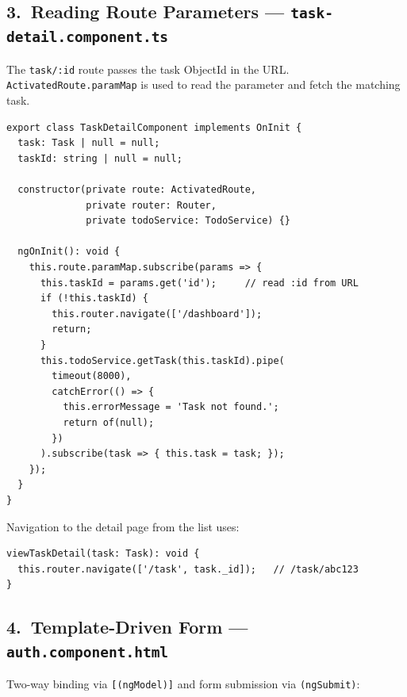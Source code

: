 \documentclass[11pt,a4paper]{article}
\begin{document}
\subsection*{3.\ Reading Route Parameters — \texttt{task-detail.component.ts}}

The \texttt{task/:id} route passes the task ObjectId in the URL.
\texttt{ActivatedRoute.paramMap} is used to read the parameter and fetch the matching task.

\begin{lstlisting}[style=ts, language={[Sharp]C}]
export class TaskDetailComponent implements OnInit {
  task: Task | null = null;
  taskId: string | null = null;

  constructor(private route: ActivatedRoute,
              private router: Router,
              private todoService: TodoService) {}

  ngOnInit(): void {
    this.route.paramMap.subscribe(params => {
      this.taskId = params.get('id');     // read :id from URL
      if (!this.taskId) {
        this.router.navigate(['/dashboard']);
        return;
      }
      this.todoService.getTask(this.taskId).pipe(
        timeout(8000),
        catchError(() => {
          this.errorMessage = 'Task not found.';
          return of(null);
        })
      ).subscribe(task => { this.task = task; });
    });
  }
}
\end{lstlisting}

Navigation to the detail page from the list uses:
\begin{lstlisting}[style=ts, language={[Sharp]C}]
viewTaskDetail(task: Task): void {
  this.router.navigate(['/task', task._id]);   // /task/abc123
}
\end{lstlisting}

\subsection*{4.\ Template-Driven Form — \texttt{auth.component.html}}

Two-way binding via \texttt{[(ngModel)]} and form submission via \texttt{(ngSubmit)}:
\end{document}
